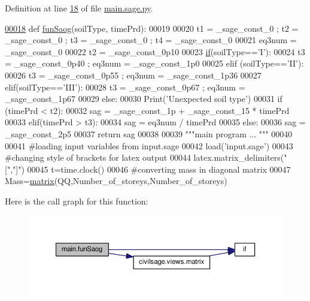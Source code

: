 Definition at line \hyperlink{main_8sage_8py_source_l00018}{18} of file \hyperlink{main_8sage_8py_source}{main.\+sage.\+py}.


\begin{DoxyCode}
\hypertarget{namespacemain_l00018}{}\hyperlink{namespacemain_a4f60afd2426ee9409955e4352b3f0486}{00018} \textcolor{keyword}{def }\hyperlink{namespacemain_a4f60afd2426ee9409955e4352b3f0486}{funSaog}(soilType, timePrd):
00019 
00020   t1 = \_sage\_const\_0 ; t2 = \_sage\_const\_0 ; t3 = \_sage\_const\_0 ; t4 = \_sage\_const\_0 
00021   eq3num = \_sage\_const\_0 
00022   t2 = \_sage\_const\_0p10 
00023   \hyperlink{bootstrap_8min_8js_ac2d69f5011896c6ed4a54e0dd36f6334}{if}(soilType==\textcolor{stringliteral}{'I'}):
00024       t3 = \_sage\_const\_0p40 ; eq3num = \_sage\_const\_1p0 
00025   \textcolor{keywordflow}{elif} (soilType==\textcolor{stringliteral}{'II'}):
00026       t3 = \_sage\_const\_0p55 ; eq3num = \_sage\_const\_1p36 
00027   elif(soilType==\textcolor{stringliteral}{'III'}):
00028       t3 = \_sage\_const\_0p67 ; eq3num = \_sage\_const\_1p67 
00029   \textcolor{keywordflow}{else}:
00030       Print(\textcolor{stringliteral}{'Unexpected soil type'})
00031   \textcolor{keywordflow}{if} (timePrd < t2):
00032       sag = \_sage\_const\_1p  + \_sage\_const\_15  * timePrd
00033   elif(timePrd > t3):
00034       sag = eq3num / timePrd
00035   \textcolor{keywordflow}{else}:
00036       sag = \_sage\_const\_2p5 
00037   \textcolor{keywordflow}{return} sag
00038 
00039 \textcolor{stringliteral}{"""main program ... """}
00040 
00041 \textcolor{comment}{#loading input variables from input.sage}
00042 load(\textcolor{stringliteral}{'input.sage'})
00043 \textcolor{comment}{#changing style of brackets for latex output}
00044 latex.matrix\_delimiters(\textcolor{stringliteral}{"["},\textcolor{stringliteral}{"]"})
00045 t=time.clock()
00046 \textcolor{comment}{#converting mass in diagonal matrix}
00047 Mass=\hyperlink{namespacecivilsage_1_1views_a8b58c93a9c82e84143c43dafaa744a4b}{matrix}(QQ,Number\_of\_storeys,Number\_of\_storeys)
\end{DoxyCode}


Here is the call graph for this function\+:\nopagebreak
\begin{figure}[H]
\begin{center}
\leavevmode
\includegraphics[width=350pt]{namespacemain_a4f60afd2426ee9409955e4352b3f0486_cgraph}
\end{center}
\end{figure}




